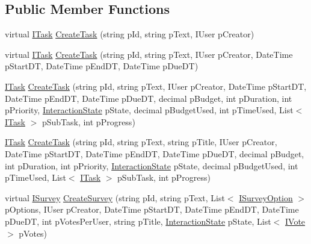 \subsection*{Public Member Functions}
\begin{DoxyCompactItemize}
\item 
virtual \hyperlink{interface_plex_byte_1_1_mo_cap_1_1_interactions_1_1_i_task}{I\+Task} \hyperlink{class_plex_byte_1_1_mo_cap_1_1_interactions_1_1_interaction_factory_a9a7f2eed60a838269aa2a4444e50ecef}{Create\+Task} (string p\+Id, string p\+Text, I\+User p\+Creator)
\item 
virtual \hyperlink{interface_plex_byte_1_1_mo_cap_1_1_interactions_1_1_i_task}{I\+Task} \hyperlink{class_plex_byte_1_1_mo_cap_1_1_interactions_1_1_interaction_factory_ab49d25714033edffd3bd5c87e453a237}{Create\+Task} (string p\+Id, string p\+Text, I\+User p\+Creator, Date\+Time p\+Start\+DT, Date\+Time p\+End\+DT, Date\+Time p\+Due\+DT)
\item 
\hyperlink{interface_plex_byte_1_1_mo_cap_1_1_interactions_1_1_i_task}{I\+Task} \hyperlink{class_plex_byte_1_1_mo_cap_1_1_interactions_1_1_interaction_factory_a1e9890e2e67cca051f1485f453a3c760}{Create\+Task} (string p\+Id, string p\+Text, I\+User p\+Creator, Date\+Time p\+Start\+DT, Date\+Time p\+End\+DT, Date\+Time p\+Due\+DT, decimal p\+Budget, int p\+Duration, int p\+Priority, \hyperlink{namespace_plex_byte_1_1_mo_cap_1_1_interactions_afcb673d9186608b6bd3b187179aedc8a}{Interaction\+State} p\+State, decimal p\+Budget\+Used, int p\+Time\+Used, List$<$ \hyperlink{interface_plex_byte_1_1_mo_cap_1_1_interactions_1_1_i_task}{I\+Task} $>$ p\+Sub\+Task, int p\+Progress)
\item 
\hyperlink{interface_plex_byte_1_1_mo_cap_1_1_interactions_1_1_i_task}{I\+Task} \hyperlink{class_plex_byte_1_1_mo_cap_1_1_interactions_1_1_interaction_factory_a030a74854486e68be1cb97166214ef16}{Create\+Task} (string p\+Id, string p\+Text, string p\+Title, I\+User p\+Creator, Date\+Time p\+Start\+DT, Date\+Time p\+End\+DT, Date\+Time p\+Due\+DT, decimal p\+Budget, int p\+Duration, int p\+Priority, \hyperlink{namespace_plex_byte_1_1_mo_cap_1_1_interactions_afcb673d9186608b6bd3b187179aedc8a}{Interaction\+State} p\+State, decimal p\+Budget\+Used, int p\+Time\+Used, List$<$ \hyperlink{interface_plex_byte_1_1_mo_cap_1_1_interactions_1_1_i_task}{I\+Task} $>$ p\+Sub\+Task, int p\+Progress)
\item 
virtual \hyperlink{interface_plex_byte_1_1_mo_cap_1_1_interactions_1_1_i_survey}{I\+Survey} \hyperlink{class_plex_byte_1_1_mo_cap_1_1_interactions_1_1_interaction_factory_a91bccc9e26b2a3ebdf9210f88e12777f}{Create\+Survey} (string p\+Id, string p\+Text, List$<$ \hyperlink{interface_plex_byte_1_1_mo_cap_1_1_interactions_1_1_i_survey_option}{I\+Survey\+Option} $>$ p\+Options, I\+User p\+Creator, Date\+Time p\+Start\+DT, Date\+Time p\+End\+DT, Date\+Time p\+Due\+DT, int p\+Votes\+Per\+User, string p\+Title, \hyperlink{namespace_plex_byte_1_1_mo_cap_1_1_interactions_afcb673d9186608b6bd3b187179aedc8a}{Interaction\+State} p\+State, List$<$ \hyperlink{interface_plex_byte_1_1_mo_cap_1_1_interactions_1_1_i_vote}{I\+Vote} $>$ p\+Votes)

\end{DoxyCompactItemize}
